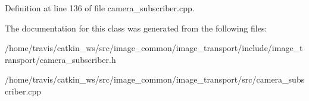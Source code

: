 Definition at line 136 of file camera\-\_\-subscriber.\-cpp.



The documentation for this class was generated from the following files\-:\begin{DoxyCompactItemize}
\item 
/home/travis/catkin\-\_\-ws/src/image\-\_\-common/image\-\_\-transport/include/image\-\_\-transport/camera\-\_\-subscriber.\-h\item 
/home/travis/catkin\-\_\-ws/src/image\-\_\-common/image\-\_\-transport/src/camera\-\_\-subscriber.\-cpp\end{DoxyCompactItemize}
